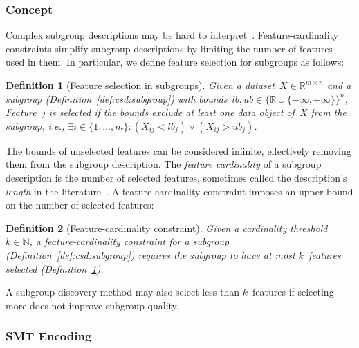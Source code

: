 \documentclass[acmsmall]{acmart} %
\theoremstyle{acmplain}
\theoremstyle{acmdefinition}
\newtheorem{definition}{Definition}
\begin{document}
\subsubsection{Concept}
\label{sec:csd:approach:cardinality:concept}

Complex subgroup descriptions may be hard to interpret~\cite{meeng2021real}.
Feature-cardinality constraints simplify subgroup descriptions by limiting the number of features used in them.
In particular, we define feature selection for subgroups as follows:
%
\begin{definition}[Feature selection in subgroups]
	Given a dataset~$X \in \mathbb{R}^{m \times n}$ and a subgroup (Definition~\ref{def:csd:subgroup}) with bounds~$\mathit{lb}, \mathit{ub} \in \{\mathbb{R} \cup \{-\infty, +\infty\}\}^n$,
	Feature~$j$ is \emph{selected} if the bounds exclude at least one data object of~$X$ from the subgroup, i.e., $\exists i \in \{1, \dots, m\}: \left( X_{ij} < \mathit{lb}_j \right) \lor \left( X_{ij} > \mathit{ub}_j \right)$.
	\label{def:csd:feature-selection}
\end{definition}
%
The bounds of unselected features can be considered infinite, effectively removing them from the subgroup description.
The \emph{feature cardinality} of a subgroup description is the number of selected features, sometimes called the description's \emph{length} in the literature~\cite{atzmueller2015subgroup, helal2016subgroup}.
A feature-cardinality constraint imposes an upper bound on the number of selected features:
%
\begin{definition}[Feature-cardinality constraint]
	Given a cardinality threshold $k \in \mathbb{N}$,
	a \emph{feature-cardinality constraint} for a subgroup (Definition~\ref{def:csd:subgroup}) requires the subgroup to have at most $k$~features selected (Definition~\ref{def:csd:feature-selection}).
	\label{def:csd:feature-cardinality-constraint}
\end{definition}
%
A subgroup-discovery method may also select less than $k$~features if selecting more does not improve subgroup quality.

\subsubsection{SMT Encoding}
\label{sec:csd:approach:cardinality:smt}
\end{document}
